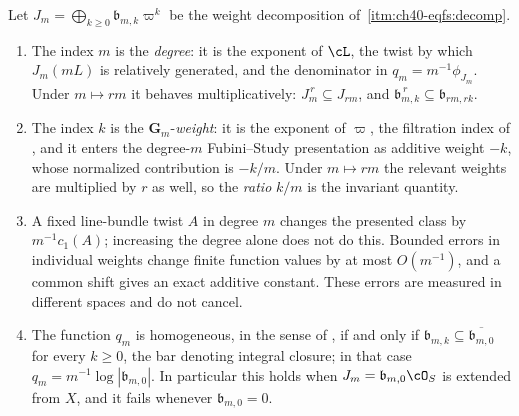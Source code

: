 \begin{proposition}
\label{prop:ch40-two-gradings-here}
Let $J_m=\bigoplus_{k\ge0}\mathfrak b_{m,k}\varpi^k$ be the weight
decomposition of \,\cref{itm:ch40-eqfs:decomp}.
\begin{enumerate}
\item\label{itm:ch40-grad:degree}
 The index $m$ is the \emph{degree}: it is the exponent of $\cL$, the
 twist by which $J_m(mL)$ is relatively generated, and the denominator in
 $q_m=m^{-1}\phi_{J_m}$.  Under $m\mapsto rm$ it behaves
 multiplicatively:
 $J_m^{\,r}\subseteq J_{rm}$, and
 $\mathfrak b_{m,k}^{\,r}\subseteq\mathfrak b_{rm,rk}$.
\item\label{itm:ch40-grad:weight}
 The index $k$ is the $\mathbf G_m$-\emph{weight}: it is the exponent of
 $\varpi$, the filtration index of , and it enters
 the degree-$m$ Fubini--Study presentation as additive weight $-k$,
 whose normalized contribution is $-k/m$.  Under
 $m\mapsto rm$ the relevant weights are multiplied by $r$ as well, so the
 \emph{ratio} $k/m$ is the invariant quantity.
\item\label{itm:ch40-grad:errors}
 A fixed line-bundle twist $A$ in degree $m$ changes the presented
 class by $m^{-1}c_1(A)$; increasing the degree alone does not do this.
 Bounded errors in individual weights change finite function values by
 at most $O(m^{-1})$, and a common shift gives an exact additive constant.
 These errors are measured in different spaces and do not cancel.
\item\label{itm:ch40-grad:homogeneous}
 The function $q_m$ is homogeneous, in the sense of
 , if and only if
 $\mathfrak b_{m,k}\subseteq\overline{\mathfrak b_{m,0}}$ for every
 $k\ge0$, the bar denoting integral closure; in that case
 $q_m=m^{-1}\log|\mathfrak b_{m,0}|$.  In particular this holds when
 $J_m=\mathfrak b_{m,0}\cO_S$ is extended from $X$, and it fails
 whenever $\mathfrak b_{m,0}=0$.
\end{enumerate}
\end{proposition}

